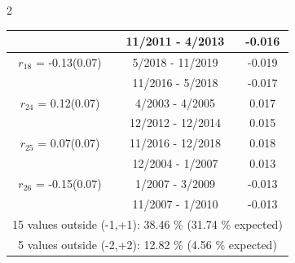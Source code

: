 \begin{multicols}{2}
{\begin{tabular}{ccc}
  &       11/2011 -  4/2013 &       -0.016  \vspace{-.02in}   \\ \hline 
    $r_{18}$ = -0.13(0.07) &       5/2018 - 11/2019 &       -0.019    \vspace{-.10in} \\ 
  &       11/2016 -  5/2018 &       -0.017  \vspace{-.02in}   \\ \hline 
    $r_{24}$ = 0.12(0.07) &       4/2003 -  4/2005 &        0.017   \vspace{-.10in} \\  
&       12/2012 - 12/2014 &        0.015  \vspace{-.02in} \\ \hline 
  $r_{25}$ = 0.07(0.07) &      11/2016 - 12/2018 &        0.018   \vspace{-.10in} \\  
&       12/2004 -  1/2007 &        0.013  \vspace{-.02in} \\ \hline 
  $r_{26}$ = -0.15(0.07) &       1/2007 -  3/2009 &       -0.013    \vspace{-.10in} \\ 
  &       11/2007 -  1/2010 &       -0.013  \vspace{-.02in}   \\ \hline 
  \multicolumn{3}{c}{              15 values outside (-1,+1): 38.46  \% (31.74  \% expected)}\vspace{-.10in} \\ 
\multicolumn{3}{c}{               5 values outside (-2,+2): 12.82 \%  (4.56 \% expected) } \\
 \end{tabular} \\ 
 } 
\end{multicols} 
